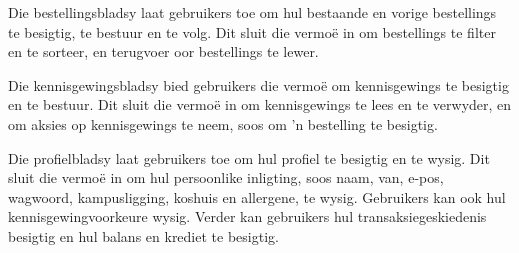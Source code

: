 Die bestellingsbladsy laat gebruikers toe om hul bestaande en vorige
bestellings te besigtig, te bestuur en te volg. Dit sluit die vermo\"e in om
bestellings te filter en te sorteer, en terugvoer oor bestellings te lewer.

Die kennisgewingsbladsy bied gebruikers die vermo\"e om kennisgewings te
besigtig en te bestuur. Dit sluit die vermo\"e in om kennisgewings te lees en
te verwyder, en om aksies op kennisgewings te neem, soos om 'n bestelling te
besigtig.

Die profielbladsy laat gebruikers toe om hul profiel te besigtig en te wysig.
Dit sluit die vermo\"e in om hul persoonlike inligting, soos naam, van, e-pos,
wagwoord, kampusligging, koshuis en allergene, te wysig. Gebruikers kan ook hul
kennisgewingvoorkeure wysig. Verder kan gebruikers hul transaksiegeskiedenis
besigtig en hul balans en krediet te besigtig.
